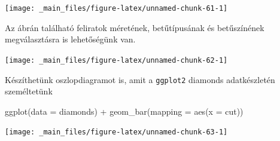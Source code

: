 \documentclass[
]{book}
\newenvironment{Shaded}{\begin{snugshade}}{\end{snugshade}}
\newcommand{\AttributeTok}[1]{\textcolor[rgb]{0.77,0.63,0.00}{#1}}
\newcommand{\DecValTok}[1]{\textcolor[rgb]{0.00,0.00,0.81}{#1}}
\newcommand{\FunctionTok}[1]{\textcolor[rgb]{0.00,0.00,0.00}{#1}}
\newcommand{\NormalTok}[1]{#1}
\newcommand{\SpecialCharTok}[1]{\textcolor[rgb]{0.00,0.00,0.00}{#1}}
\newcommand{\StringTok}[1]{\textcolor[rgb]{0.31,0.60,0.02}{#1}}
\begin{document}
\begin{center}\texttt{[image: \_main\_files/figure-latex/unnamed-chunk-61-1]} \end{center}

Az ábrán található feliratok méretének, betűtípusának és betűszínének
megválasztásra is lehetőségünk van.

\begin{Shaded}
\end{Shaded}

\begin{center}\texttt{[image: \_main\_files/figure-latex/unnamed-chunk-62-1]} \end{center}

Készíthetünk oszlopdiagramot is, amit a \texttt{ggplot2} diamonds
adatkészletén személtetünk

\begin{Shaded}
\begin{Highlighting}[]
\FunctionTok{ggplot}\NormalTok{(}\AttributeTok{data =}\NormalTok{ diamonds) }\SpecialCharTok{+}
  \FunctionTok{geom\_bar}\NormalTok{(}\AttributeTok{mapping =} \FunctionTok{aes}\NormalTok{(}\AttributeTok{x =}\NormalTok{ cut))}
\end{Highlighting}
\end{Shaded}

\begin{center}\texttt{[image: \_main\_files/figure-latex/unnamed-chunk-63-1]} \end{center}
\end{document}

